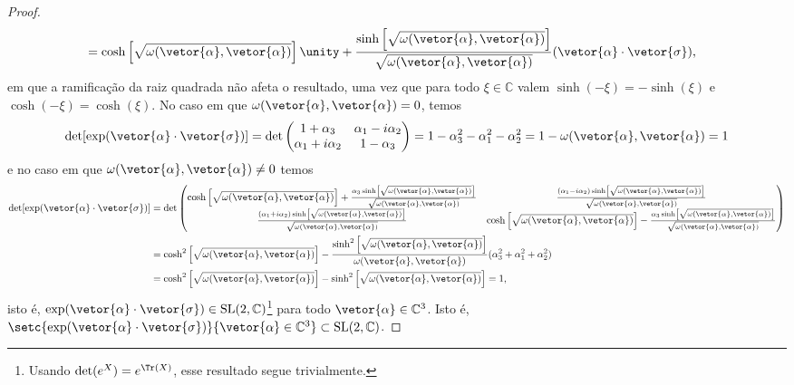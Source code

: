 \begin{proof}
\begin{align*}
        &= \cosh\left[\sqrt{\omega(\vetor{\alpha},\vetor{\alpha})}\right] \unity + \frac{\sinh\left[\sqrt{\omega(\vetor{\alpha}, \vetor{\alpha})}\right]}{\sqrt{\omega(\vetor{\alpha},\vetor{\alpha})}}(\vetor{\alpha}\cdot\vetor{\sigma}),
    \end{align*}
    em que a ramificação da raiz quadrada não afeta o resultado, uma vez que para todo \(\xi \in \mathbb{C}\) valem \(\sinh(-\xi) = -\sinh(\xi)\) e \(\cosh(-\xi) = \cosh(\xi)\). No caso em que \(\omega(\vetor{\alpha}, \vetor{\alpha}) = 0\), temos
    \begin{equation*}
        \det[\exp(\vetor{\alpha}\cdot\vetor{\sigma})] = \det \begin{pmatrix}
            1 + \alpha_3 & \alpha_1 - i \alpha_2\\
            \alpha_1 + i \alpha_2 & 1 - \alpha_3
        \end{pmatrix} = 1 - \alpha_3^2 - \alpha_1^2 - \alpha_2^2 = 1 - \omega(\vetor{\alpha}, \vetor{\alpha}) = 1
    \end{equation*}
    e no caso em que \(\omega(\vetor{\alpha}, \vetor{\alpha}) \neq 0\) temos
    \begin{align*}
        \det[\exp(\vetor{\alpha}\cdot\vetor{\sigma})]
        &= \det \begin{pmatrix}
            \cosh\left[\sqrt{\omega(\vetor{\alpha},\vetor{\alpha})}\right] + \frac{\alpha_3 \sinh\left[\sqrt{\omega(\vetor{\alpha},\vetor{\alpha})}\right]}{\sqrt{\omega(\vetor{\alpha},\vetor{\alpha})}} & \frac{(\alpha_1 - i \alpha_2) \sinh\left[\sqrt{\omega(\vetor{\alpha},\vetor{\alpha})}\right]}{\sqrt{\omega(\vetor{\alpha},\vetor{\alpha})}}\\
            \frac{(\alpha_1 + i \alpha_2) \sinh\left[\sqrt{\omega(\vetor{\alpha},\vetor{\alpha})}\right]}{\sqrt{\omega(\vetor{\alpha},\vetor{\alpha})}} & \cosh\left[\sqrt{\omega(\vetor{\alpha},\vetor{\alpha})}\right] - \frac{\alpha_3 \sinh\left[\sqrt{\omega(\vetor{\alpha},\vetor{\alpha})}\right]}{\sqrt{\omega(\vetor{\alpha},\vetor{\alpha})}}\\
        \end{pmatrix}\\
        &= \cosh^2\left[\sqrt{\omega(\vetor{\alpha},\vetor{\alpha})}\right] - \frac{\sinh^2\left[\sqrt{\omega(\vetor{\alpha},\vetor{\alpha})}\right]}{\omega(\vetor{\alpha}, \vetor{\alpha})}(\alpha_3^2 + \alpha_1^2 + \alpha_2^2)\\
        &= \cosh^2\left[\sqrt{\omega(\vetor{\alpha},\vetor{\alpha})}\right] - \sinh^2\left[\sqrt{\omega(\vetor{\alpha},\vetor{\alpha})}\right] = 1,
    \end{align*}
    isto é, \(\exp(\vetor{\alpha}\cdot \vetor{\sigma}) \in \mathrm{SL}(2, \mathbb{C})\)\footnote{Usando \(\det(e^X) = e^{\Tr(X)}\), esse resultado segue trivialmente.} para todo \(\vetor{\alpha} \in \mathbb{C}^3\). Isto é, \(\setc{\exp(\vetor{\alpha}\cdot\vetor{\sigma})}{\vetor{\alpha} \in \mathbb{C}^3} \subset \mathrm{SL}(2,\mathbb{C})\).


\end{proof}

